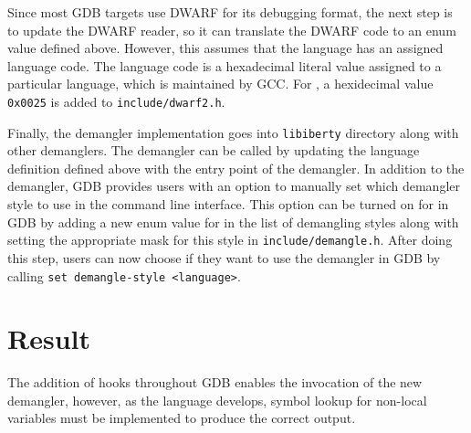 Since most GDB targets use DWARF for its debugging format, the next step is to
update the DWARF reader, so it can translate the DWARF code to an enum value defined
above. However, this assumes that the language has an assigned language code.
The language code is a hexadecimal literal value assigned to a particular
language, which is maintained by GCC. For \CFA, a hexidecimal value
\verb|0x0025| is added to \verb|include/dwarf2.h|.

Finally, the demangler implementation goes into \verb|libiberty| directory along with
other demanglers. The demangler can be called by updating the language
definition defined above with the entry point of the \CFAS demangler.
In addition to the demangler, GDB provides users with an option
to manually set which demangler style to use in the command line interface.
This option can be turned on for \CFAS in GDB by adding a new enum value for \CFAS in
the list of demangling styles along with setting the appropriate mask for this
style in \verb|include/demangle.h|. After doing this step, users can now choose
if they want to use the \CFAS demangler in GDB by calling \verb|set demangle-style <language>|.

\section{Result}
The addition of hooks throughout GDB enables the invocation of the new \CFAS demangler, however, as the
language develops, symbol lookup for non-local variables must be implemented to
produce the correct output.
